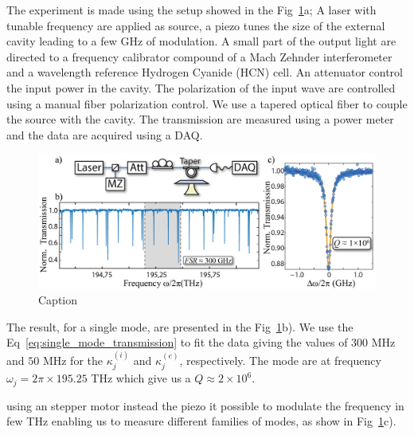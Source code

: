 The experiment is made using the setup showed in the  Fig~\ref{fig:exp_mode_charac}a; A laser with tunable frequency are applied as source, a piezo tunes the size of the external cavity leading to a few GHz of modulation. A small part of the output light are directed to a frequency calibrator compound of a Mach Zehnder interferometer and a wavelength reference Hydrogen Cyanide (HCN) cell. An attenuator control the input power in the cavity. The polarization of the input wave are controlled using a manual fiber polarization control. We use a tapered optical fiber to couple the source with the cavity. The transmission are measured using a power meter and the data are acquired using a DAQ. 
\begin{figure}[h!]
    \centering
    \includegraphics[width = 16cm]{figuras/Dissertation_optical_char_exp.jpg}
    \caption{Caption}
    \label{fig:exp_mode_charac}
\end{figure}

The result, for a single mode, are presented in the Fig~\ref{fig:exp_mode_charac}b). We use the Eq~\ref{eq:single_mode_transmission} to fit the data giving the values of $300$ MHz and $50$ MHz for the $\kappa_j^{(i)}$ and $\kappa_j^{(e)}$, respectively. The mode are at frequency $\omega_j = 2\pi\times195.25$ THz which give us a $Q \approx 2\times10^6$.

using an stepper motor instead the piezo it possible to modulate the frequency in few THz enabling us to measure different families of modes, as show in Fig~\ref{fig:exp_mode_charac}c).










